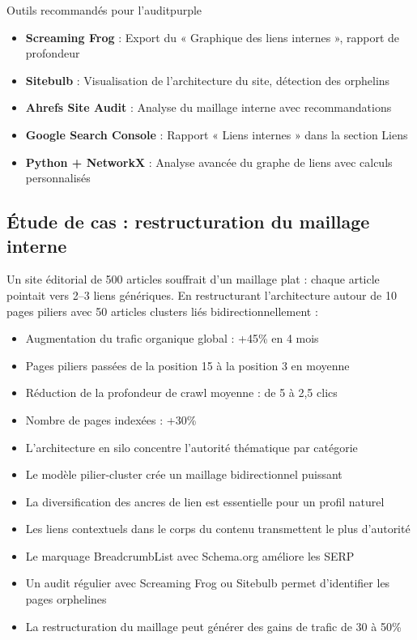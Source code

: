 \documentclass[12pt,a4paper,twoside]{report}
\begin{document}
\begin{mybox}{Outils recommandés pour l'audit}{purple}
\begin{itemize}
    \item \textbf{Screaming Frog} : Export du « Graphique des liens internes », rapport de profondeur
    \item \textbf{Sitebulb} : Visualisation de l'architecture du site, détection des orphelins
    \item \textbf{Ahrefs Site Audit} : Analyse du maillage interne avec recommandations
    \item \textbf{Google Search Console} : Rapport « Liens internes » dans la section Liens
    \item \textbf{Python + NetworkX} : Analyse avancée du graphe de liens avec calculs personnalisés
\end{itemize}
\end{mybox}

\subsection{Étude de cas : restructuration du maillage interne}

Un site éditorial de 500 articles souffrait d'un maillage plat : chaque article pointait vers 2--3 liens génériques. En restructurant l'architecture autour de 10 pages piliers avec 50 articles clusters liés bidirectionnellement :

\begin{itemize}
    \item Augmentation du trafic organique global : +45\% en 4 mois
    \item Pages piliers passées de la position 15 à la position 3 en moyenne
    \item Réduction de la profondeur de crawl moyenne : de 5 à 2,5 clics
    \item Nombre de pages indexées : +30\%
\end{itemize}

\begin{takeaways}
\begin{itemize}
    \item L'architecture en silo concentre l'autorité thématique par catégorie
    \item Le modèle pilier-cluster crée un maillage bidirectionnel puissant
    \item La diversification des ancres de lien est essentielle pour un profil naturel
    \item Les liens contextuels dans le corps du contenu transmettent le plus d'autorité
    \item Le marquage BreadcrumbList avec Schema.org améliore les SERP
    \item Un audit régulier avec Screaming Frog ou Sitebulb permet d'identifier les pages orphelines
    \item La restructuration du maillage peut générer des gains de trafic de 30 à 50\%
\end{itemize}
\end{takeaways}
\end{document}
